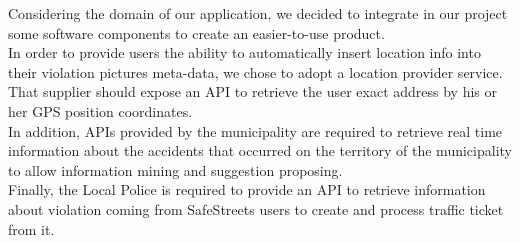 Considering the domain of our application, we  decided to integrate in our project some software components to create an easier-to-use product. 
\\In order to provide users the ability to automatically insert location info into their violation pictures meta-data, we chose to adopt a location provider service. That supplier should expose an API to retrieve the user exact address by his or her GPS position coordinates. 
\\In addition, APIs provided by the municipality are required to retrieve real time information about the accidents	that	occurred	on	the	territory	of	the	municipality to allow information mining and suggestion proposing.
\\Finally, the Local Police is required to provide an API to retrieve information about violation coming from SafeStreets users to create and process traffic ticket from it.